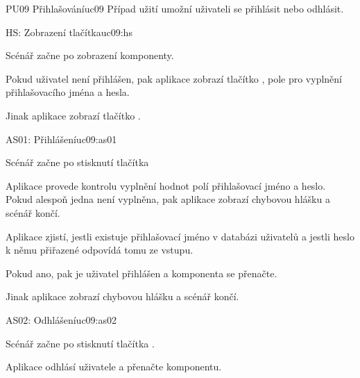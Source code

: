 \begin{usecase}{PU09 Přihlašování}{uc09}
    Případ užití umožní uživateli se přihlásit nebo odhlásit.

    \begin{scenario}{HS: Zobrazení tlačítka}{uc09:hs}
        \item Scénář začne po zobrazení komponenty.
        \item Pokud uživatel není přihlášen, pak aplikace zobrazí tlačítko , pole pro vyplnění přihlašovacího jména a hesla.
        \item Jinak aplikace zobrazí tlačítko .
    \end{scenario}


    \begin{scenario}{AS01: Přihlášení}{uc09:as01}
        \item Scénář začne po stisknutí tlačítka 
        \item Aplikace provede kontrolu vyplnění hodnot polí přihlašovací jméno a heslo. Pokud alespoň jedna není vyplněna, pak aplikace zobrazí chybovou hlášku a scénář končí.
        \item Aplikace zjistí, jestli existuje přihlašovací jméno v databázi uživatelů a jestli heslo k němu přiřazené odpovídá tomu ze vstupu.
        \item Pokud ano, pak je uživatel přihlášen a komponenta se přenačte.
        \item Jinak aplikace zobrazí chybovou hlášku a scénář končí.
    \end{scenario}
    
    \begin{scenario}{AS02: Odhlášení}{uc09:as02}
        \item Scénář začne po stisknutí tlačítka .
        \item Aplikace odhlásí uživatele a přenačte komponentu.
    \end{scenario}
\end{usecase}